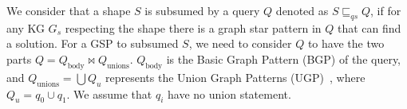 We consider that a shape $S$ is subsumed by a query $Q$ denoted as $S \sqsubseteq_{qs} Q$, 
if for any KG $G_s$ respecting the shape there is a graph star pattern in $Q$ that can find a solution.
For a GSP to subsumed $S$, we need to consider $Q$ to have the two parts $Q = Q_{\text{body}} \bowtie Q_{\text{unions}}$.
$Q_{\text{body}}$ is the Basic Graph Pattern (BGP) of the query, and $Q_{\text{unions}} = \bigcup Q_u$ represents the Union Graph Patterns (UGP)~\cite{w3SPARQLQuery}, where $Q_u = q_0 \cup q_1$.
We assume that $q_i$ have no union statement.

